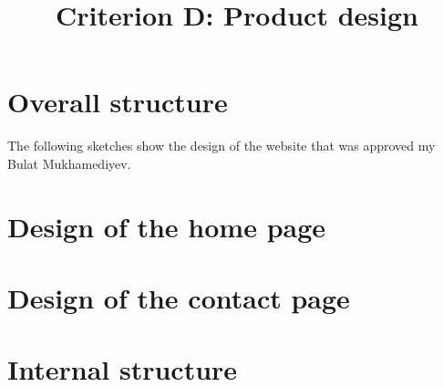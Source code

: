 \documentclass[a4paper]{article}
\title{Criterion D: Product design}
\date{}
\begin{document}
\maketitle

  \section*{Overall structure}

  The following sketches show the design of the website that was approved my Bulat Mukhamediyev.
  
  \section*{Design of the home page}

  \section*{Design of the contact page}

  \section*{Internal structure}
\end{document}
